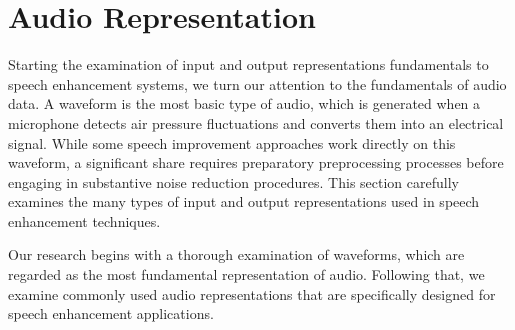 \section{Audio Representation \cite{manilow2020}}
Starting the examination of input and output representations fundamentals to speech enhancement systems, we turn our attention to the fundamentals of audio data. A waveform is the most basic type of audio, which is generated when a microphone detects air pressure fluctuations and converts them into an electrical signal. While some speech improvement approaches work directly on this waveform, a significant share requires preparatory preprocessing processes before engaging in substantive noise reduction procedures. This section carefully examines the many types of input and output representations used in speech enhancement techniques.

Our research begins with a thorough examination of waveforms, which are regarded as the most fundamental representation of audio. Following that, we examine commonly used audio representations that are specifically designed for speech enhancement applications.



